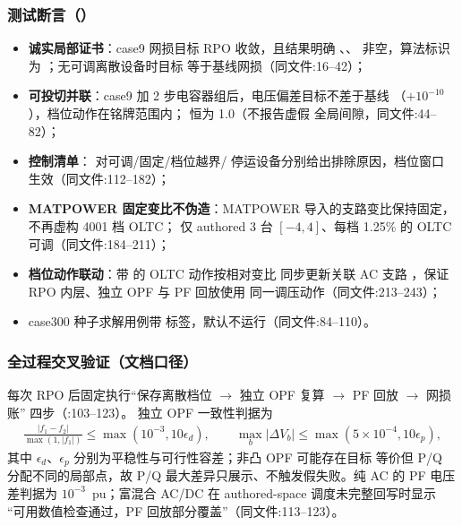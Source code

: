 \subsubsection*{测试断言（）}
\begin{itemize}
  \item \textbf{诚实局部证书}：case9 网损目标 RPO 收敛，且结果明确
        、、
         非空，算法标识为
        ；无可调离散设备时目标
        等于基线网损（同文件:16--42）；
  \item \textbf{可投切并联}：case9 加 2 步电容器组后，电压偏差目标不差于基线
        （$+10^{-10}$），档位动作在铭牌范围内； 恒为 1.0（不报告虚假
        全局间隙，同文件:44--82）；
  \item \textbf{控制清单}： 对可调/固定/档位越界/
        停运设备分别给出排除原因，档位窗口  生效（同文件:112--182）；
  \item \textbf{MATPOWER 固定变比不伪造}：MATPOWER 导入的支路变比保持固定，
        不再虚构 4001 档 OLTC； 仅 authored 3 台
        $[-4,4]$、每档 1.25\% 的 OLTC 可调（同文件:184--211）；
  \item \textbf{档位动作联动}：带  的 OLTC 动作按相对变比
        同步更新关联 AC 支路 ，保证 RPO 内层、独立 OPF 与 PF 回放使用
        同一调压动作（同文件:213--243）；
  \item case300 种子求解用例带 \fld{[.performance]} 标签，默认不运行（同文件:84--110）。
\end{itemize}

\subsubsection*{全过程交叉验证（文档口径）}
每次 RPO 后固定执行“保存离散档位 $\to$ 独立 OPF 复算 $\to$ PF 回放 $\to$ 网损账”
四步（:103--123）。
独立 OPF 一致性判据为
\begin{align*}
\frac{|f_1-f_2|}{\max(1,|f_1|)}\le\max(10^{-3},10\epsilon_d),\qquad
\max_b|\Delta V_b|\le\max(5\times10^{-4},10\epsilon_p),
\end{align*}
其中 $\epsilon_d$、$\epsilon_p$ 分别为平稳性与可行性容差；非凸 OPF 可能存在目标
等价但 P/Q 分配不同的局部点，故 P/Q 最大差异只展示、不触发假失败。纯 AC 的 PF
电压差判据为 $10^{-3}$~pu；富混合 AC/DC 在 authored-space 调度未完整回写时显示
“可用数值检查通过，PF 回放部分覆盖”（同文件:113--123）。

